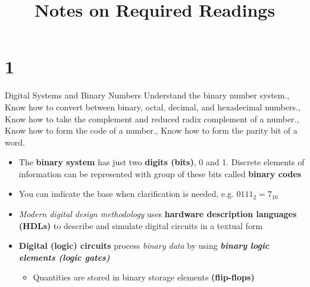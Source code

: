 \documentclass[mode=chapternotes, palette=purple, fontsize=12pt, font=default, official=false]{modernclassnotes}
\title{Notes on Required Readings}
\begin{document}
\maketitle
\tableofcontents

\newpage
\chapter{1}{Digital Systems and Binary Numbers}{%
  Understand the binary number system.,%
  {Know how to convert between binary, octal, decimal, and hexadecimal numbers.},%
  Know how to take the complement and reduced radix complement of a number.,%
  Know how to form the code of a number.,%
  Know how to form the parity bit of a word.%
}
\begin{itemize}
    \item The \textbf{binary system} has just two \textbf{digits (bits)}, 0 and 1. Discrete elements of information can be represented with group of these bits called \textbf{binary codes}
    \item You can indicate the base when clarification is needed, e.g. \(0111_{2}=7_{10}\)
    \item \textit{Modern digital design methodology} uses \textbf{hardware description languages (HDLs)} to describe and simulate digital circuits in a textual form
    \item \textbf{Digital (logic) circuits} process \textit{binary data} by using \textbf{\textit{binary logic elements (logic gates)}}
    \begin{itemize}
        \item Quantities are stored in binary storage elements \textbf{(flip-flops)}
    \end{itemize}
\end{itemize}






\end{document}
